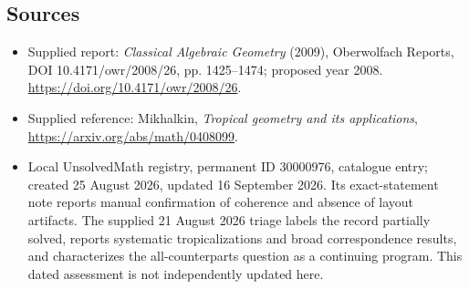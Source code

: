 \documentclass[11pt]{article}
\begin{document}
\subsection{Sources}
\begin{itemize}
\item Supplied report: \emph{Classical Algebraic Geometry} (2009), Oberwolfach Reports, DOI 10.4171/owr/2008/26, pp. 1425--1474; proposed year 2008. \url{https://doi.org/10.4171/owr/2008/26}.
\item Supplied reference: Mikhalkin, \emph{Tropical geometry and its applications}, \url{https://arxiv.org/abs/math/0408099}.
\item Local UnsolvedMath registry, permanent ID 30000976, catalogue entry; created 25 August 2026, updated 16 September 2026. Its exact-statement note reports manual confirmation of coherence and absence of layout artifacts. The supplied 21 August 2026 triage labels the record partially solved, reports systematic tropicalizations and broad correspondence results, and characterizes the all-counterparts question as a continuing program. This dated assessment is not independently updated here.
\end{itemize}
\end{document}
